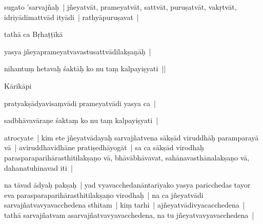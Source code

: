 \documentclass[article,12pt,a4paper]{memoir}%
\newcounter{parCount}
\begin{document}
	  \pstart \leavevmode%
	sugato 'sarvajñaḥ | jñeyatvāt, prameyatvāt, sattvāt, puruṣatvāt, vakṛtvāt, idriyādimattvād ityādi | rathyāpuruṣavat | 
	{}
	\pend%
      

	  \pstart \leavevmode%
	tathā ca Bṛhaṭṭīkā 
	{}
	\pend%
      

	  \pstart \leavevmode%
	yasya jñeyaprameyatvavastusattvādilakṣaṇāḥ | 
	{}
	\pend%
      

	  \pstart \leavevmode%
	nihantuṃ hetavaḥ śaktāḥ ko nu taṃ kalpayiṣyati || 
	{}
	\pend%
      

	  \pstart \leavevmode%
	Kārikāpi 
	{}
	\pend%
      

	  \pstart \leavevmode%
	pratyakṣādyavisaṃvādi prameyatvādi yasya ca | 
	{}
	\pend%
      

	  \pstart \leavevmode%
	sadbhāvavāraṇe śaktaṃ ko nu taṃ kalpayiṣyati | 
	{}
	\pend%
      

	  \pstart \leavevmode%
	\label{thakur75-23.21}atrocyate | kim ete jñeyatvādayaḥ sarvajñatvena sākṣād viruddhāḥ paramparayā vā | aviruddhavidhāne pratiṣedhāyogāt | sa ca sākṣād virodhaḥ parasparaparihārasthitilakṣaṇo vā, bhāvābhāvavat, sahānavasthānalakṣaṇo vā, dahanatuhinavad iti | 
	{}
	\pend%
      

	  \pstart \leavevmode%
	\label{thakur75-23.24}na tāvad ādyaḥ pakṣaḥ | yad vyavacchedanāntarīyako yasya paricchedas tayor eva parasparaparihārasthitilakṣaṇo virodhaḥ | na ca jñeyatvādi sarvajñatvavyavacchedena sthitam | kiṃ tarhi | ajñeyatvādivyacacchedena | tathā sarvajñatvam asarvajñatvavyavacchedena, na tu jñeyatvavyavacchedena | 
	{}
	\pend%
      
\end{document}
